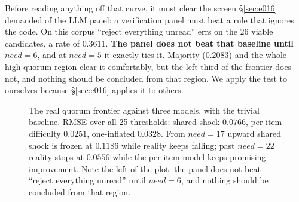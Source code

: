 \documentclass[11pt,a4paper]{article}
\begin{document}
Before reading anything off that curve, it must clear the screen
\S\ref{sec:e016} demanded of the LLM panel: a verification panel must beat a rule
that ignores the code. On this corpus ``reject everything unread'' errs on the 26
viable candidates, a rate of $0.3611$. \textbf{The panel does not beat that
baseline until $\mathit{need} = 6$}, and at $\mathit{need} = 5$ it exactly ties it.
Majority ($0.2083$) and the whole high-quorum region clear it comfortably, but the
left third of the frontier does not, and nothing should be concluded from that
region. We apply the test to ourselves because \S\ref{sec:e016} applies it to
others.

\begin{figure}[t]
\centering
{}
\caption{The real quorum frontier against three models, with the trivial
baseline. RMSE over all 25 thresholds: shared shock $0.0766$, per-item difficulty
$0.0251$, one-inflated $0.0328$. From $\mathit{need} = 17$ upward shared shock is
frozen at $0.1186$ while reality keeps falling; past $\mathit{need} = 22$ reality
stops at $0.0556$ while the per-item model keeps promising improvement. Note the
left of the plot: the panel does not beat ``reject everything unread'' until
$\mathit{need} = 6$, and nothing should be concluded from that region.}
\label{fig:quorum}
\end{figure}
\end{document}
